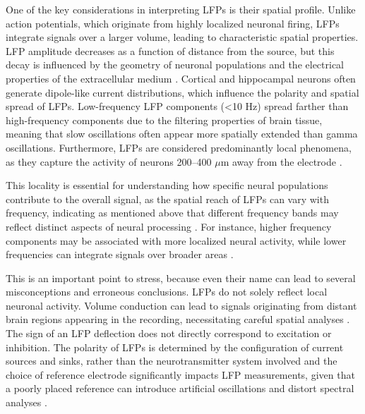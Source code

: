 \documentclass{article}
\begin{document}
One of the key considerations in interpreting LFPs is their spatial profile. Unlike action potentials, which originate from highly localized neuronal firing, LFPs integrate signals over a larger volume, leading to characteristic spatial properties. LFP amplitude decreases as a function of distance from the source, but this decay is influenced by the geometry of neuronal populations and the electrical properties of the extracellular medium \cite{einevoll2022}. Cortical and hippocampal neurons often generate dipole-like current distributions, which influence the polarity and spatial spread of LFPs. Low-frequency LFP components (<10 Hz) spread farther than high-frequency components due to the filtering properties of brain tissue, meaning that slow oscillations often appear more spatially extended than gamma oscillations. Furthermore, LFPs are considered predominantly local phenomena, as they capture the activity of neurons 200--400 $\mu$m away from the electrode \cite{kajikawa2011, leski2011}. 

This locality is essential for understanding how specific neural populations contribute to the overall signal, as the spatial reach of LFPs can vary with frequency, indicating as mentioned above that different frequency bands may reflect distinct aspects of neural processing \cite{nolan2016}. For instance, higher frequency components may be associated with more localized neural activity, while lower frequencies can integrate signals over broader areas \cite{herreras2016}.

This is an important point to stress, because even their name can lead to several misconceptions and erroneous conclusions. LFPs do not solely reflect local neuronal activity. Volume conduction can lead to signals originating from distant brain regions appearing in the recording, necessitating careful spatial analyses \cite{herreras2016}. The sign of an LFP deflection does not directly correspond to excitation or inhibition. The polarity of LFPs is determined by the configuration of current sources and sinks, rather than the neurotransmitter system involved and the choice of reference electrode significantly impacts LFP measurements, given that a poorly placed reference can introduce artificial oscillations and distort spectral analyses \cite{einevoll2022}.
\end{document}
